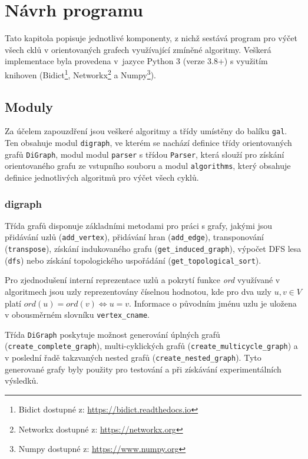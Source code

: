\chapter{Návrh programu}
    \label{chapter:Design}
    Tato kapitola popisuje jednotlivé komponenty, z nichž sestává program pro výčet všech cklů v orientovaných grafech využívající zmíněné algoritmy. Veškerá implementace byla provedena v~jazyce Python 3 (verze 3.8+) s využitím knihoven (Bidict\footnote{Bidict dostupné z: \url{https://bidict.readthedocs.io}}, Networkx\footnote{Networkx dostupné z: \url{https://networkx.org}} a Numpy\footnote{Numpy dostupné z: \url{https://www.numpy.org}}).

    \section{Moduly}
        Za účelem zapouzdření jsou veškeré algoritmy a třídy umístěny do balíku \texttt{gal}. Ten obsahuje modul \texttt{digraph}, ve kterém se nachází definice třídy orientovaných grafů \texttt{DiGraph}, modul modul \texttt{parser} s třídou \texttt{Parser}, která slouží pro získání orientovaného grafu ze vstupního souboru a modul \texttt{algorithms}, který obsahuje definice jednotlivých algoritmů pro výčet všech cyklů.

        \subsection{digraph}
            Třída grafů disponuje základními metodami pro práci s grafy, jakými jsou přidávání uzlů (\texttt{add\_vertex}), přidávání hran (\texttt{add\_edge}), transponování (\texttt{transpose}), získání indukovaného grafu (\texttt{get\_induced\_graph}), výpočet DFS lesa (\texttt{dfs}) nebo získání topologického uspořádání (\texttt{get\_topological\_sort}).

            Pro zjednodušení interní reprezentace uzlů a pokrytí funkce \textit{ord} využívané v algoritmech jsou uzly reprezentovány číselnou hodnotou, kde pro dva uzly $u, v \in V$ platí $ord(u) = ord(v) \iff u = v$. Informace o původním jménu uzlu je uložena v obousměrném slovníku \texttt{vertex\_cname}.

            Třída \texttt{DiGraph} poskytuje možnost generování úplných grafů (\texttt{create\_complete\_graph}), multi-cyklických grafů (\texttt{create\_multicycle\_graph}) a v poslední řadě takzvaných nested grafů (\texttt{create\_nested\_graph}). Tyto generované grafy byly použity pro testování a  při získávání experimentálních výsledků.


